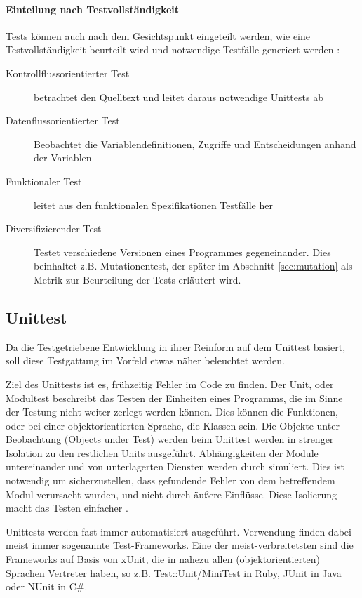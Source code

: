 \paragraph{Einteilung nach Testvollständigkeit} Tests können auch nach dem Gesichtspunkt eingeteilt werden, wie eine Testvollständigkeit beurteilt wird und notwendige Testfälle generiert werden \citep{liggesmeyer_modultest_1990}:
\begin{description}
 \item[Kontrollflussorientierter Test] betrachtet den Quelltext und leitet daraus notwendige Unittests ab
 \item[Datenflussorientierter Test] Beobachtet die Variablendefinitionen, Zugriffe und Entscheidungen anhand der Variablen
 \item[Funktionaler Test] leitet aus den funktionalen Spezifikationen Testfälle her
 \item[Diversifizierender Test] Testet verschiedene Versionen eines Programmes gegeneinander. Dies beinhaltet z.B. Mutationentest, der später im Abschnitt \ref{sec:mutation} \textit{} als Metrik zur Beurteilung der Tests erläutert wird.
\end{description}
\subsection{Unittest}
Da die Testgetriebene Entwicklung in ihrer Reinform auf dem Unittest basiert, soll diese Testgattung im Vorfeld etwas näher beleuchtet werden.

Ziel des Unittests ist es, frühzeitig Fehler im Code zu finden. Der Unit, oder Modultest beschreibt das Testen der Einheiten eines Programms, die im Sinne der Testung nicht weiter zerlegt werden können. Dies können die Funktionen, oder bei einer objektorientierten Sprache, die Klassen sein. Die Objekte unter Beobachtung (Objects under Test) werden beim Unittest werden in strenger Isolation zu den restlichen Units ausgeführt. Abhängigkeiten der Module untereinander und von unterlagerten Diensten werden durch  simuliert. Dies ist notwendig um sicherzustellen, dass gefundende Fehler von dem betreffendem Modul verursacht wurden, und nicht durch äußere Einflüsse. Diese Isolierung macht das Testen einfacher \citep{goodliffe_code_2006}.



Unittests werden fast immer automatisiert ausgeführt. Verwendung finden dabei meist immer sogenannte Test-Frameworks. Eine der meist-verbreitetsten sind die Frameworks auf Basis von xUnit, die in nahezu allen (objektorientierten) Sprachen Vertreter haben, so z.B. Test::Unit/MiniTest in Ruby, JUnit in Java oder NUnit in C\#.


